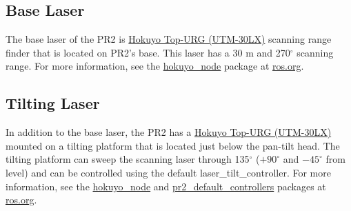 \subsection{Base Laser}
The base laser of the PR2 is \href{http://www.hokuyo-aut.jp/02sensor/07scanner/utm_30lx.html}{Hokuyo Top-URG (UTM-30LX)} 
scanning range finder that is located on PR2's base. This laser has a 30 m and 270$^\circ$ scanning range. For more information, 
see the \href{http://www.ros.org/wiki/hokuyo_node}{hokuyo\_node} package at \href{http://www.ros.org}{ros.org}.

\subsection{Tilting Laser}
\label{tilting laser}
In addition to the base laser, the PR2 has a \href{http://www.hokuyo-aut.jp/02sensor/07scanner/utm_30lx.html}{Hokuyo Top-URG (UTM-30LX)}
mounted on a tilting platform that is located just below the pan-tilt head. The tilting platform can sweep the scanning 
laser through 135$^\circ$ ($+90^\circ$ and $-45^\circ$ from level) and can be controlled using the
default laser\_tilt\_controller. For more information, see the \href{http://www.ros.org/wiki/hokuyo_node}{hokuyo\_node} 
and \href{http://www.ros.org/wiki/pr2_default_controllers}{pr2\_default\_controllers} packages at \href{http://www.ros.org}{ros.org}.

